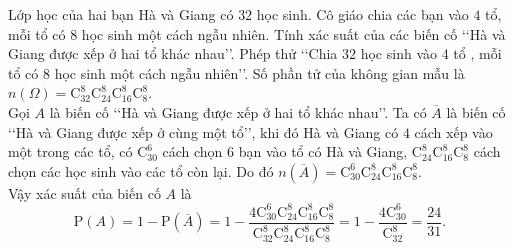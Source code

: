 \begin{bt}%
	Lớp học của hai bạn Hà và Giang có $32$ học sinh. Cô giáo chia các bạn vào $4$ tổ, mỗi tổ có $8$ học sinh một cách ngẫu nhiên. Tính xác suất của các biến cố \lq\lq Hà và Giang được xếp ở hai tổ khác nhau\rq\rq.
	\loigiai
	{Phép thử \lq\lq Chia $32$ học sinh vào $4$ tổ , mỗi tổ có $8$ học sinh một cách ngẫu nhiên\rq\rq. Số phần tử của không gian mẫu là $n(\Omega)=\mathrm{C}_{32}^8 \mathrm{C}_{24}^8 \mathrm{C}_{16}^8 \mathrm{C}_8^8$.\\
		Gọi $A$ là biến cố \lq\lq Hà và Giang được xếp ở hai tổ khác nhau\rq\rq. Ta có $\overline{A}$ là biến cố \lq\lq Hà và Giang được xếp ở cùng một tổ\rq\rq, khi đó Hà và Giang có $4$ cách xếp vào một trong các tổ, có $\mathrm{C}_{30}^6$ cách chọn $6$ bạn vào tổ có Hà và Giang, $\mathrm{C}_{24}^8\mathrm{C}_{16}^8\mathrm{C}_8^8$ cách chọn các học sinh vào các tổ còn lại. Do đó $n\left(\overline{A}\right) = \mathrm{C}_{30}^6 \mathrm{C}_{24}^8 \mathrm{C}_{16}^8 \mathrm{C}_8^8$.\\
		Vậy xác suất của biến cố $A$ là   
		$$\mathrm{P}(A)= 1-\mathrm{P}\left(\overline{A}\right) = 1-\dfrac{4\mathrm{C}_{30}^6\mathrm{C}_{24}^8\mathrm{C}_{16}^8\mathrm{C}_8^8}{\mathrm{C}_{32}^8\mathrm{C}_{24}^8\mathrm{C}_{16}^8\mathrm{C}_8^8}=1-\dfrac{4\mathrm{C}_{30}^6}{\mathrm{C}_{32}^8}=\dfrac{24}{31}.$$}
\end{bt}


